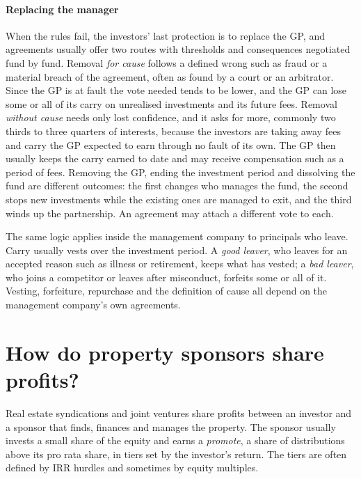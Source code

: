\begin{chapterrefs}
\paragraph{Replacing the manager}
When the rules fail, the investors' last protection is to replace the GP, and agreements usually
offer two routes with thresholds and consequences negotiated fund by fund. Removal \emph{for cause}
follows a defined wrong such as fraud or a material breach of the agreement, often as found by a court
or an arbitrator. Since the GP is at fault the vote needed tends to be lower, and the GP can lose some
or all of its carry on unrealised investments and its future fees. Removal \emph{without cause} needs
only lost confidence, and it asks for more, commonly two thirds to three quarters of interests,
because the investors are taking away fees and carry the GP expected to earn through no fault of its
own. The GP then usually keeps the carry earned to date and may receive compensation such as a period
of fees. Removing the GP, ending the investment period and dissolving the fund are different outcomes:
the first changes who manages the fund, the second stops new investments while the existing ones are
managed to exit, and the third winds up the partnership. An agreement may attach a different vote to
each.

The same logic applies inside the management company to principals who leave. Carry usually vests
over the investment period. A \emph{good leaver}, who leaves for an accepted reason such as illness or
retirement, keeps what has vested; a \emph{bad leaver}, who joins a competitor or leaves after
misconduct, forfeits some or all of it. Vesting, forfeiture, repurchase and the definition of cause all depend on
the management company's own agreements.

\FloatBarrier
\section{How do property sponsors share profits?}
\label{sec2:promote}

Real estate syndications and joint ventures share profits between an investor and a sponsor that
finds, finances and manages the property. The sponsor usually invests a small share of the equity and
earns a \emph{promote}, a share of distributions above its pro rata share, in tiers set by the
investor's return. The tiers are often defined by IRR hurdles and sometimes by equity multiples.


\end{chapterrefs}
